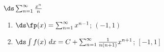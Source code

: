 {$\ds\sum_{n=1}^\infty \frac{x^n}{n}$
}
{\begin{enumerate}
	\item $\ds \fp(x) = \sum_{n=1}^\infty x^{n-1}$; \quad $(-1,1)$
	\item	$\ds \int f(x)\ dx = C+\sum_{n=1}^\infty \frac{1}{n(n+1)}x^{n+1}$; \quad $[-1,1]$
\end{enumerate}
}